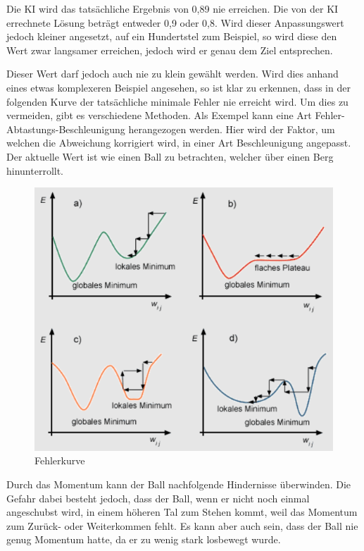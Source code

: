 Die KI wird das tatsächliche Ergebnis von 0,89 nie erreichen. Die von der KI errechnete Lösung beträgt entweder 0,9 oder 0,8. Wird dieser Anpassungswert jedoch kleiner angesetzt, auf ein Hundertstel zum Beispiel, so wird diese den Wert zwar langsamer erreichen, jedoch wird er genau dem Ziel entsprechen.

Dieser Wert darf jedoch auch nie zu klein gewählt werden. Wird dies anhand eines etwas komplexeren Beispiel angesehen, so ist klar zu erkennen, dass in der folgenden Kurve der tatsächliche minimale Fehler nie erreicht wird. Um dies zu vermeiden, gibt es verschiedene Methoden. Als Exempel kann eine Art Fehler-Abtastungs-Beschleunigung herangezogen werden. Hier wird der Faktor, um welchen die Abweichung korrigiert wird, in einer Art Beschleunigung angepasst. Der aktuelle Wert ist wie einen Ball zu betrachten, welcher über einen Berg hinunterrollt.

\begin{figure}[H]
    \centering
    \includegraphics[scale=1]{pics/ai/fehlerkurve.png}
    \caption{Fehlerkurve \cite{tech:fehlerkurve:cite}}
    \label{fig:tech:Fehler}
\end{figure}

Durch das Momentum kann der Ball nachfolgende Hindernisse überwinden. Die Gefahr dabei besteht jedoch, dass der Ball, wenn er nicht noch einmal angeschubst wird, in einem höheren Tal zum Stehen kommt, weil das Momentum zum Zurück- oder Weiterkommen fehlt. Es kann aber auch sein, dass der Ball nie genug Momentum hatte, da er zu wenig stark losbewegt wurde.

